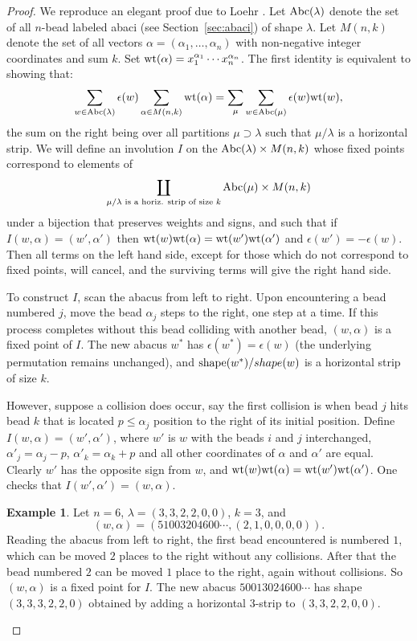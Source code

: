 \documentclass[11pt]{amsart}
\theoremstyle{definition}
\theoremstyle{example}
\newtheorem{example}[theorem]{Example}
\newcommand{\wt}{\textup{wt}}
\newcommand{\shape}{\textup{shape}}
\newcommand{\abc}{\textup{Abc}}
\begin{document}
\begin{proof}
  We reproduce an elegant proof due to Loehr \cite{loehr}. 
  Let $\abc(\lambda)$ denote the set of all $n$-bead labeled abaci (see Section~\ref{sec:abaci}) of shape $\lambda$.
  Let $M(n,k)$ denote the set of all vectors $\alpha=(\alpha_1,\dots,\alpha_n)$ with non-negative integer coordinates and sum $k$.
  Set $\wt(\alpha)=x_1^{\alpha_1}\dotsb x_n^{\alpha_n}$.
  The first identity is equivalent to showing that:
  \begin{displaymath}
    \sum_{w\in \abc(\lambda)} \epsilon(w)\sum_{\alpha\in M(n,k)} \wt(\alpha) = \sum_\mu \sum_{w\in \abc(\mu)} \epsilon(w) \wt(w),
  \end{displaymath}
  the sum on the right being over all partitions $\mu\supset\lambda$ such that $\mu/\lambda$ is a horizontal strip.
  We will define an involution $I$ on the $\abc(\lambda)\times M(n,k)$ whose fixed points correspond to elements of
\begin{displaymath}
  \coprod_{\mu/\lambda \text{ is a horiz. strip of size $k$}}\abc(\mu)\times M(n,k)
\end{displaymath}
under a bijection that preserves weights and signs, and such that if $I(w, \alpha)=(w', \alpha')$ then $\wt(w)\wt(\alpha)=\wt(w')\wt(\alpha')$ and $\epsilon(w') = -\epsilon(w)$.
  Then all terms on the left hand side, except for those which do not correspond to fixed points, will cancel, and the surviving terms will give the right hand side.

  To construct $I$, scan the abacus from left to right.
  Upon encountering a bead numbered $j$, move the bead $\alpha_j$ steps to the right, one step at a time.
  If this process completes without this bead colliding with another bead, $(w,\alpha)$ is a fixed point of $I$.
  The new abacus $w^*$ has $\epsilon(w^*)=\epsilon(w)$ (the underlying permutation remains unchanged), and $\shape(w^*)/shape(w)$ is a horizontal strip of size $k$.

  However, suppose a collision does occur, say the first collision is when bead $j$ hits bead $k$ that is located $p\leq \alpha_j$ position to the right of its initial position.
  Define $I(w,\alpha) = (w',\alpha')$, where $w'$ is $w$ with the beads $i$ and $j$ interchanged, $\alpha'_j=\alpha_j-p$, $\alpha'_k=\alpha_k+p$ and all other coordinates of $\alpha$ and $\alpha'$ are equal.
  Clearly $w'$ has the opposite sign from $w$, and $\wt(w)\wt(\alpha)=\wt(w')\wt(\alpha')$.
  One checks that $I(w',\alpha')=(w,\alpha)$.
  \begin{example}
    \label{example:bead-h}
    Let $n=6$, $\lambda=(3,3,2,2,0,0)$, $k=3$, and
    \begin{displaymath}
      (w, \alpha) = (51003204600\dotsb, (2, 1, 0, 0, 0, 0)). 
    \end{displaymath}
    Reading the abacus from left to right, the first bead encountered is numbered $1$, which can be moved $2$ places to the right without any collisions.
    After that the bead numbered $2$ can be moved $1$ place to the right, again without collisions.
    So $(w,\alpha)$ is a fixed point for $I$.
    The new abacus $50013024600\dotsb$ has shape $(3,3,3,2,2,0)$ obtained by adding a horizontal $3$-strip to $(3, 3, 2, 2, 0, 0)$.


\end{example}
\end{proof}
\end{document}

